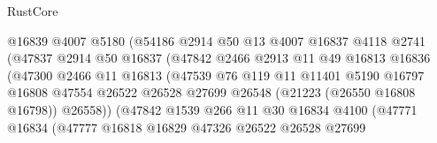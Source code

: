 \begin{lexlean}{RustCore}
\begin{coremodule}
                                @16839
                                @4007
                                @5180
                                (@54186
                                  @2914
                                  @50
                                  @13
                                  @4007
                                  @16837
                                  @4118
                                  @2741
                                  (@47837
                                    @2914
                                    @50
                                    @16837
                                    (@47842
                                      @2466
                                      @2913
                                      @11
                                      @49
                                      @16813
                                      @16836
                                      (@47300
                                        @2466
                                        @11
                                        @16813
                                        (@47539
                                          @76
                                          @119
                                          @11
                                          @11401
                                          @5190
                                          @16797
                                          @16808
                                          @47554
                                          @26522
                                          @26528
                                          @27699
                                          @26548
                                          (@21223 (@26550 @16808 @16798))
                                          @26558))
                                      (@47842
                                        @1539
                                        @266
                                        @11
                                        @30
                                        @16834
                                        @4100
                                        (@47771
                                          @16834
                                          (@47777
                                            @16818
                                            @16829
                                            @47326
                                            @26522
                                            @26528
                                            @27699

\end{coremodule}
\end{lexlean}
